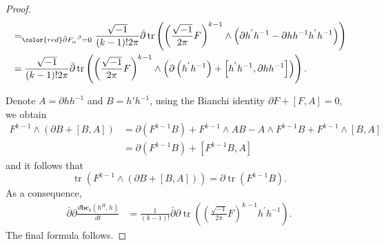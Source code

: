 \documentclass[10pt, letterpaper]{amsart}
\newcommand{\tr}{\operatorname{tr}}
\newcommand{\dbar}{\bar{\partial}}
\theoremstyle{plain}
\theoremstyle{definition}
\numberwithin{equation}{section}
\begin{document}
\begin{proof}
\begin{equation}
\begin{split}
	& =_{\color{red}\bar\partial F_\alpha^{\phantom{\alpha}\beta}=0} \frac{\sqrt{-1}}{(k-1)!2\pi} \dbar \tr \left ( \left (\frac{\sqrt{-1}}{2\pi}F \right)^{k-1} \wedge\left( \partial h ^{'} h^{-1} -\partial h h^{-1} h^{'} h^{-1}\right) \right) \\
	& = \frac{\sqrt{-1}}{(k-1)!2\pi} \dbar \tr \left ( \left (\frac{\sqrt{-1}}{2\pi}F \right)^{k-1} \wedge\left( \partial \left( h ^{'} h^{-1} \right) +\left[ h^{'} h^{-1},\partial h h^{-1} \right] \right) \right).
	\label{bcexp}
	\end{split}
	\end{equation}
	
	
	
	Denote $A= \partial hh^{-1}$ and $B=h'h^{-1}$, using the Bianchi identity $\partial F + \left[F, A\right]=0$, we obtain 
	\begin{equation*}
	\begin{split}
	F^{k-1} \wedge\left( \partial B +\left[ B,A \right]\right)
	& = 
	\partial \left( F^{k-1}B\right) 
	+ 
	F^{k-1}\wedge AB - A\wedge F^{k-1} B
	+ 
	F^{k-1}\wedge\left[B,A\right]\\
	& = 
	\partial \left(F^{k-1}B\right) 
	+ 
	\left[ F^{k-1}B, A\right]
	\end{split}
	\end{equation*}
	and it follows that 
	\[
	\tr \left( F^{k-1}\wedge \left( \partial B +\left[ B,A \right]\right) \right)
	= 
	\partial \tr \left(F^{k-1}B\right).
	\]
	As a consequence, 
	\begin{equation}
	\begin{split}
	\dbar\partial \frac{d \mathbf{bc}_k \left(h^H,h\right)}{dt}
	& = 
	\frac{1}{(k-1)!}
	\dbar \partial \tr \left ( \left (\frac{\sqrt{-1}}{2\pi}F \right)^{k-1} h ^{'} h^{-1}  \right).
	\end{split}
	\end{equation}
	The final formula follows.
	
\end{proof}
\end{document}
